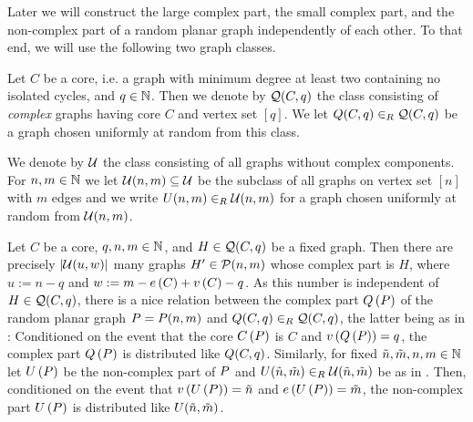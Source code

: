 Later we will construct the large complex part, the small complex part, and the non-complex part of a random planar graph independently of each other. To that end, we will use the following two graph classes.
\begin{definition}\label{MDdef:random_complex_part}
	Let $C$ be a core, i.e. a graph with minimum degree at least two containing no isolated cycles, and $q\in \mathbb{N}$. Then we denote by $\mathcal{Q}(C,q)$ the class consisting of {\em complex} graphs having core $C$ and vertex set $[q]$. We let $Q(C,q)\in_R\mathcal{Q}(C,q)$ be a graph chosen uniformly at random from this class.
\end{definition}

\begin{definition}\label{MDdef:nocomplex}
We denote by $\mathcal{U}$ the class consisting of all graphs without complex components. For $n,m\in\mathbb{N}$ we let $\mathcal{U}(n,m)\subseteq\mathcal{U}$ be the subclass of all graphs on vertex set $[n]$ with $m$ edges and we write $U(n,m)\in_R \mathcal{U}(n,m)$ for a graph chosen uniformly at random from $\mathcal{U}(n,m)$.
\end{definition}

\begin{remark}\label{MDrem:connection_conditional}
Let $C$ be a core, $q, n, m \in\mathbb{N}$, and $H\in\mathcal{Q}(C,q)$ be a fixed graph. Then there are precisely $\left|\mathcal{U}(u,w)\right|$ many graphs $H'\in\mathcal{P}(n,m)$ whose complex part is $H$, where $u:=n-q$ and $w:=m-e\left({C}\right)+v\left({C}\right)-q$. As this number is independent of $H\in\mathcal{Q}(C,q)$, there is a nice relation between the complex part $Q\left(P\right)$ of the random planar graph $P=P(n,m)$ and $Q(C,q)\in_R\mathcal{Q}(C,q)$, the latter being as in : Conditioned on the event that the core $C\left(P\right)$ is $C$ and $v\left({Q\left(P\right)}\right)=q$, the complex part $Q\left(P\right)$ is distributed like $Q(C,q)$. Similarly, for fixed $\tilde{n},\tilde{m},n,m \in \mathbb{N}$ let $U\left(P\right)$ be the non-complex part of $P$ and $U(\tilde{n},\tilde{m})\in_R \mathcal{U}(\tilde{n},\tilde{m})$ be as in . Then, conditioned on the event that $v\left({U\left(P\right)}\right)=\tilde{n}$ and $e\left({U\left(P\right)}\right)=\tilde{m}$, the non-complex part $U\left(P\right)$ is distributed like $U(\tilde{n},\tilde{m})$.
\end{remark}

